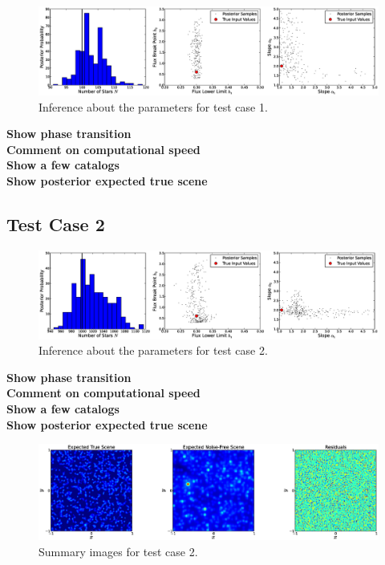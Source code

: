 \documentclass[manuscript]{aastex}
\begin{document}
\begin{figure}
\begin{center}
\includegraphics[scale=0.33]{Figures/inference1.eps}
\end{center}
\caption{Inference about the parameters for test case 1.\label{fig:results1}}
\end{figure}

{\bf Show phase transition}\\
{\bf Comment on computational speed}\\
{\bf Show a few catalogs}\\
{\bf Show posterior expected true scene}\\

\subsection{Test Case 2}

\begin{figure}
\begin{center}
\includegraphics[scale=0.33]{Figures/inference2.eps}
\end{center}
\caption{Inference about the parameters for test case 2.\label{fig:results2}}
\end{figure}



{\bf Show phase transition}\\
{\bf Comment on computational speed}\\
{\bf Show a few catalogs}\\
{\bf Show posterior expected true scene}\\

\begin{figure}
\begin{center}
\includegraphics[scale=0.4]{Figures/summaries.eps}
\end{center}
\caption{Summary images for test case 2.\label{fig:summaries}}
\end{figure}
\end{document}
